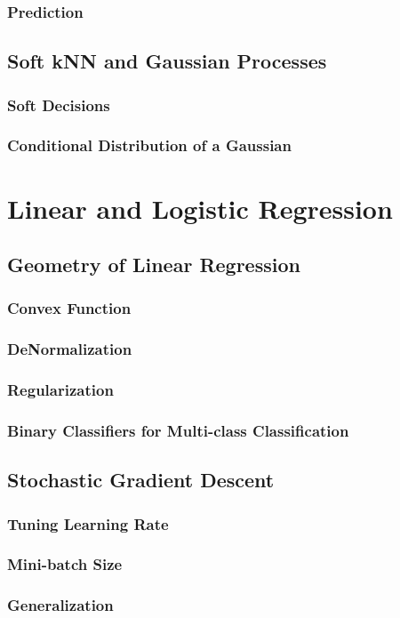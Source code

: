 \documentclass[a4paper,12pt]{article}
\begin{document}
\subsubsection{Prediction}

\subsection{Soft kNN and Gaussian Processes}

\subsubsection{Soft Decisions}

\subsubsection{Conditional Distribution of a Gaussian}

\section{Linear and Logistic Regression}

\subsection{Geometry of Linear Regression}

\subsubsection{Convex Function}

\subsubsection{DeNormalization}

\subsubsection{Regularization}

\subsubsection{Binary Classifiers for Multi-class Classification}

\subsection{Stochastic Gradient Descent}

\subsubsection{Tuning Learning Rate}

\subsubsection{Mini-batch Size}

\subsubsection{Generalization}
\end{document}
